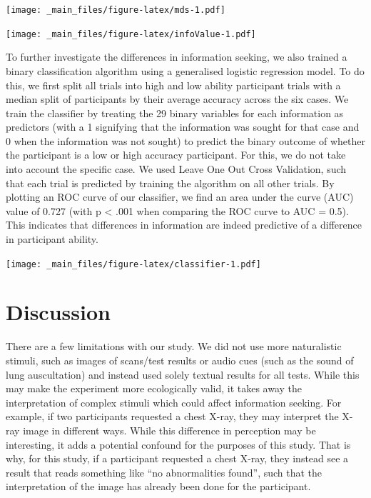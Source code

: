 \documentclass[a4paper, nobind]{templates/ociamthesis}
\begin{document}
\texttt{[image: \_main\_files/figure-latex/mds-1.pdf]}

\texttt{[image: \_main\_files/figure-latex/infoValue-1.pdf]}

To further investigate the differences in information seeking, we also trained a binary classification algorithm using a generalised logistic regression model. To do this, we first split all trials into high and low ability participant trials with a median split of participants by their average accuracy across the six cases. We train the classifier by treating the 29 binary variables for each information as predictors (with a 1 signifying that the information was sought for that case and 0 when the information was not sought) to predict the binary outcome of whether the participant is a low or high accuracy participant. For this, we do not take into account the specific case. We used Leave One Out Cross Validation, such that each trial is predicted by training the algorithm on all other trials. By plotting an ROC curve of our classifier, we find an area under the curve (AUC) value of 0.727 (with p \textless{} .001 when comparing the ROC curve to AUC = 0.5). This indicates that differences in information are indeed predictive of a difference in participant ability.

\texttt{[image: \_main\_files/figure-latex/classifier-1.pdf]}

\hypertarget{discussion}{%
\section*{Discussion}\label{discussion}}

There are a few limitations with our study. We did not use more naturalistic stimuli, such as images of scans/test results or audio cues (such as the sound of lung auscultation) and instead used solely textual results for all tests. While this may make the experiment more ecologically valid, it takes away the interpretation of complex stimuli which could affect information seeking. For example, if two participants requested a chest X-ray, they may interpret the X-ray image in different ways. While this difference in perception may be interesting, it adds a potential confound for the purposes of this study. That is why, for this study, if a participant requested a chest X-ray, they instead see a result that reads something like ``no abnormalities found'', such that the interpretation of the image has already been done for the participant.
\end{document}
